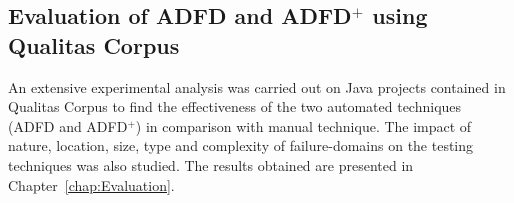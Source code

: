 




\subsection{Evaluation of ADFD and ADFD$^+$ using Qualitas Corpus}

An extensive experimental analysis was carried out on Java projects contained in Qualitas Corpus to find the effectiveness of the two automated techniques (ADFD and ADFD$^+$) in comparison with manual technique. The impact of nature, location, size, type and complexity of failure-domains on the testing techniques was also studied. The results obtained are presented in Chapter~\ref{chap:Evaluation}.








